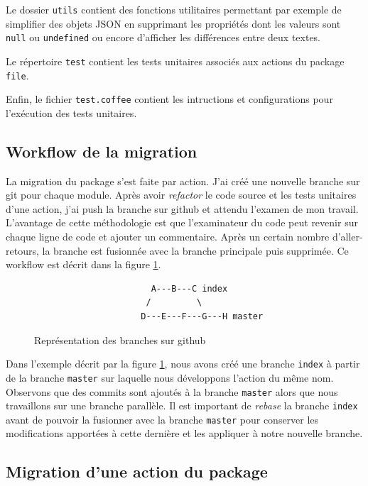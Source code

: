 \documentclass[12pt, french]{report}
\begin{document}
Le dossier \texttt{utils} contient des fonctions utilitaires permettant par exemple de simplifier des objets JSON en supprimant les propriétés dont les valeurs sont \texttt{null} ou \texttt{undefined} ou encore d'afficher les différences entre deux textes.

Le répertoire \texttt{test} contient les tests unitaires associés aux actions du package \texttt{file}.

Enfin, le fichier \texttt{test.coffee} contient les intructions et configurations pour l'exécution des tests unitaires.

\subsection{Workflow de la migration}

La migration du package s'est faite par action. J'ai créé une nouvelle branche sur \gls{git} pour chaque module. Après avoir \textit{refactor} le code source et les tests unitaires d'une action, j'ai push la branche sur \gls{github} et attendu l'examen de mon travail. L'avantage de cette méthodologie est que l'examinateur du code peut revenir sur chaque ligne de code et ajouter un commentaire. Après un certain nombre d'aller-retours, la branche est fusionnée avec la branche principale puis supprimée. Ce workflow est décrit dans la figure \ref{fig:gitbranches}.


\begin{figure}[h]
\begin{verbatim}
                       A---B---C index
                      /         \
                     D---E---F---G---H master
\end{verbatim}
\centering
\caption{Représentation des branches sur \gls{github}}
\label{fig:gitbranches}
\end{figure}

Dans l'exemple décrit par la figure \ref{fig:gitbranches}, nous avons créé une branche \texttt{index} à partir de la branche \texttt{master} sur laquelle nous développons l'action du même nom. Observons que des commits sont ajoutés à la branche \texttt{master} alors que nous travaillons sur une branche parallèle. Il est important de \textit{rebase} la branche \texttt{index} avant de pouvoir la fusionner avec la branche \texttt{master} pour conserver les modifications apportées à cette dernière et les appliquer à notre nouvelle branche.

\subsection{Migration d'une action du package}
\end{document}
